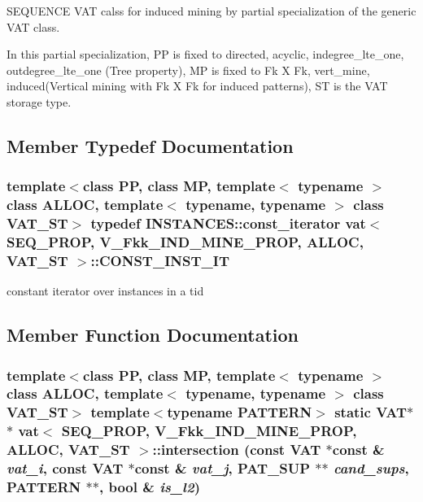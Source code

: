 SEQUENCE VAT calss for induced mining by partial specialization of the generic VAT class. 

In this partial specialization, PP is fixed to directed, acyclic, indegree\_\-lte\_\-one, outdegree\_\-lte\_\-one (Tree property), MP is fixed to Fk X Fk, vert\_\-mine, induced(Vertical mining with Fk X Fk for induced patterns), ST is the VAT storage type. 



\subsection{Member Typedef Documentation}
\subsubsection{\setlength{\rightskip}{0pt plus 5cm}template$<$class PP, class MP, template$<$ typename $>$ class ALLOC, template$<$ typename, typename $>$ class VAT\_\-ST$>$ typedef INSTANCES::const\_\-iterator \bf{vat}$<$ SEQ\_\-PROP, V\_\-Fkk\_\-IND\_\-MINE\_\-PROP, ALLOC, VAT\_\-ST $>$::\bf{CONST\_\-INST\_\-IT}}\label{classvat_3_01SEQ__PROP_00_01V__Fkk__IND__MINE__PROP_00_01ALLOC_00_01VAT__ST_01_4_a7dcbb37a996314e7ec7a0dcb6fa1d69}


constant iterator over instances in a tid 

\subsection{Member Function Documentation}
\subsubsection{\setlength{\rightskip}{0pt plus 5cm}template$<$class PP, class MP, template$<$ typename $>$ class ALLOC, template$<$ typename, typename $>$ class VAT\_\-ST$>$ template$<$typename PATTERN$>$ static \bf{VAT}$\ast$$\ast$ \bf{vat}$<$ SEQ\_\-PROP, V\_\-Fkk\_\-IND\_\-MINE\_\-PROP, ALLOC, VAT\_\-ST $>$::intersection (const \bf{VAT} $\ast$const \& {\em vat\_\-i}, const \bf{VAT} $\ast$const \& {\em vat\_\-j}, \bf{PAT\_\-SUP} $\ast$$\ast$ {\em cand\_\-sups}, PATTERN $\ast$$\ast$, bool \& {\em is\_\-l2})\hspace{0.3cm}{\tt  [inline, static]}}\label{classvat_3_01SEQ__PROP_00_01V__Fkk__IND__MINE__PROP_00_01ALLOC_00_01VAT__ST_01_4_32faebe97f0dcbf38bbfe91e0c0a0174}



